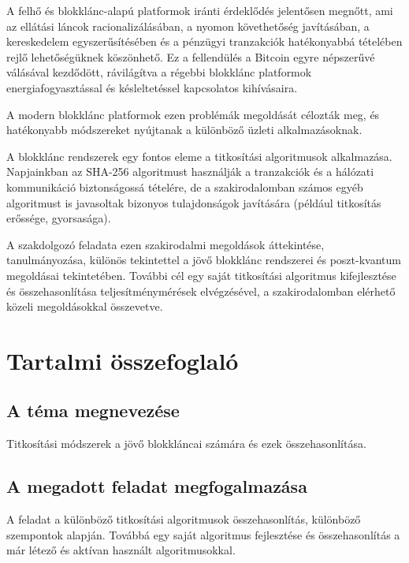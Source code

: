 \documentclass[12pt]{report} %
\begin{document}
A felhő és blokklánc-alapú platformok iránti érdeklődés jelentősen megnőtt, ami az ellátási láncok racionalizálásában, a nyomon követhetőség javításában, a kereskedelem egyszerűsítésében és a pénzügyi tranzakciók hatékonyabbá tételében rejlő lehetőségüknek köszönhető. Ez a fellendülés a Bitcoin egyre népszerűvé válásával kezdődött, rávilágítva a régebbi blokklánc platformok energiafogyasztással és késleltetéssel kapcsolatos kihívásaira.

A modern blokklánc platformok ezen problémák megoldását célozták meg, és hatékonyabb módszereket nyújtanak a különböző üzleti alkalmazásoknak.

A blokklánc rendszerek egy fontos eleme a titkosítási algoritmusok alkalmazása. Napjainkban az SHA-256 algoritmust használják a tranzakciók és a hálózati kommunikáció biztonságossá tételére, de a szakirodalomban számos egyéb algoritmust is javasoltak bizonyos tulajdonságok javítására (például titkosítás erőssége, gyorsasága).

A szakdolgozó feladata ezen szakirodalmi megoldások áttekintése, tanulmányozása, különös tekintettel a jövő blokklánc rendszerei és poszt-kvantum megoldásai tekintetében. További cél egy saját titkosítási algoritmus kifejlesztése és összehasonlítása teljesítménymérések elvégzésével, a szakirodalomban elérhető közeli megoldásokkal összevetve.

\chapter*{Tartalmi összefoglaló} %

\section*{A téma megnevezése} %

Titkosítási módszerek a jövő blokkláncai számára és ezek összehasonlítása.

\section*{A megadott feladat megfogalmazása} %

A feladat a különböző titkosítási algoritmusok összehasonlítás, különböző szempontok alapján. Továbbá egy saját algoritmus fejlesztése és összehasonlítás a már létező és aktívan használt algoritmusokkal.
\end{document}
